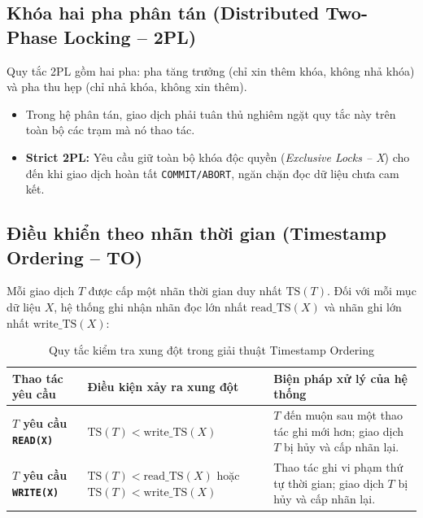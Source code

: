 \documentclass[12pt,a4paper]{report}
\begin{document}
\subsection{Khóa hai pha phân tán (Distributed Two-Phase Locking -- 2PL)}
Quy tắc 2PL gồm hai pha: pha tăng trưởng (chỉ xin thêm khóa, không nhả khóa) và pha thu hẹp (chỉ nhả khóa, không xin thêm). 
\begin{itemize}[leftmargin=0.8cm, topsep=1pt, itemsep=1pt]
    \item Trong hệ phân tán, giao dịch phải tuân thủ nghiêm ngặt quy tắc này trên toàn bộ các trạm mà nó thao tác.
    \item \textbf{Strict 2PL:} Yêu cầu giữ toàn bộ khóa độc quyền (\textit{Exclusive Locks -- X}) cho đến khi giao dịch hoàn tất \texttt{COMMIT/ABORT}, ngăn chặn đọc dữ liệu chưa cam kết.
\end{itemize}

\subsection{Điều khiển theo nhãn thời gian (Timestamp Ordering -- TO)}
Mỗi giao dịch $T$ được cấp một nhãn thời gian duy nhất $\text{TS}(T)$. Đối với mỗi mục dữ liệu $X$, hệ thống ghi nhận nhãn đọc lớn nhất $\text{read\_TS}(X)$ và nhãn ghi lớn nhất $\text{write\_TS}(X)$:

\begin{table}[!ht]
\centering
\small
\caption{Quy tắc kiểm tra xung đột trong giải thuật Timestamp Ordering}
\label{tab:timestamp_ordering}
\renewcommand{\arraystretch}{1.2}
\begin{tabularx}{\textwidth}{|>{\raggedright\arraybackslash\bfseries}p{3.5cm}|>{\raggedright\arraybackslash}X|>{\raggedright\arraybackslash}X|}
\hline
\textbf{Thao tác yêu cầu} & \textbf{Điều kiện xảy ra xung đột} & \textbf{Biện pháp xử lý của hệ thống} \\ \hline
$T$ yêu cầu \texttt{READ(X)} & $\text{TS}(T) < \text{write\_TS}(X)$ & $T$ đến muộn sau một thao tác ghi mới hơn; giao dịch $T$ bị hủy và cấp nhãn lại. \\ \hline
$T$ yêu cầu \texttt{WRITE(X)} & $\text{TS}(T) < \text{read\_TS}(X)$ hoặc $\text{TS}(T) < \text{write\_TS}(X)$ & Thao tác ghi vi phạm thứ tự thời gian; giao dịch $T$ bị hủy và cấp nhãn lại. \\ \hline
\end{tabularx}
\end{table}
\end{document}
